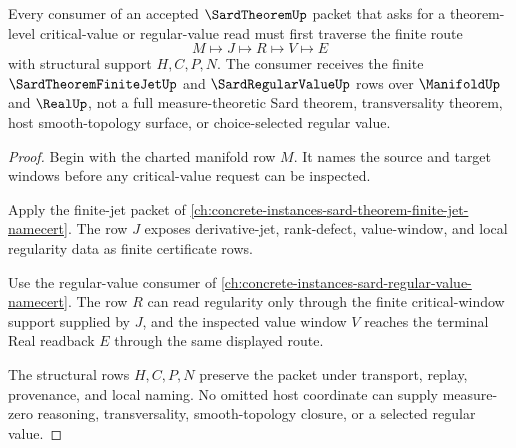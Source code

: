 \begin{theorem}
\label{thm:sard-theorem-critical-value-route}
Every consumer of an accepted $\SardTheoremUp$ packet that asks for a theorem-level critical-value or regular-value read must first traverse the finite route
$$
M\longmapsto J\longmapsto R\longmapsto V\longmapsto E
$$
with structural support $H,C,P,N$. The consumer receives the finite $\SardTheoremFiniteJetUp$ and $\SardRegularValueUp$ rows over $\ManifoldUp$ and $\RealUp$, not a full measure-theoretic Sard theorem, transversality theorem, host smooth-topology surface, or choice-selected regular value.
\end{theorem}
\begin{proof}
Begin with the charted manifold row $M$. It names the source and target windows before any critical-value request can be inspected.

Apply the finite-jet packet of \autoref{ch:concrete-instances-sard-theorem-finite-jet-namecert}. The row $J$ exposes derivative-jet, rank-defect, value-window, and local regularity data as finite certificate rows.

Use the regular-value consumer of \autoref{ch:concrete-instances-sard-regular-value-namecert}. The row $R$ can read regularity only through the finite critical-window support supplied by $J$, and the inspected value window $V$ reaches the terminal Real readback $E$ through the same displayed route.

The structural rows $H,C,P,N$ preserve the packet under transport, replay, provenance, and local naming. No omitted host coordinate can supply measure-zero reasoning, transversality, smooth-topology closure, or a selected regular value.
\end{proof}





